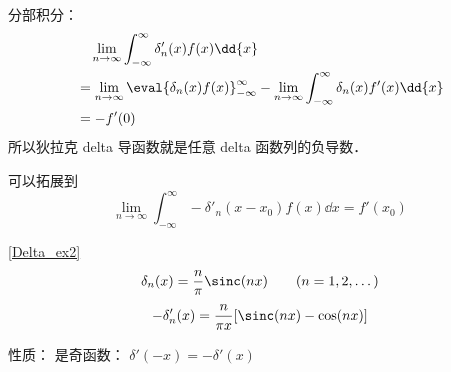 
\begin{issues}
\issueDraft
\end{issues}


分部积分：
\begin{equation}
\begin{aligned}
&\quad \lim_{n\to\infty}\int_{-\infty}^\infty \delta'_n(x) f(x) \dd{x}\\
&= \lim_{n\to\infty}\eval{\delta_n(x) f(x)}_{-\infty}^\infty - \lim_{n\to\infty}\int_{-\infty}^\infty \delta_n(x) f'(x) \dd{x}\\
&= - f'(0)
\end{aligned}
\end{equation}
所以狄拉克 delta 导函数就是任意 delta 函数列的负导数．

可以拓展到
\begin{equation}
\lim_{n\to\infty}\int_{-\infty}^\infty -\delta'_n(x-x_0) f(x) \dd{x} = f'(x_0)
\end{equation}

\begin{example}{}
\autoref{Delta_ex2}~
\begin{equation}
\delta_n(x) = \frac{n}{\pi}\sinc(n x) \qquad (n = 1, 2, \dots)
\end{equation}
\begin{equation}
-\delta'_n(x) = \frac{n}{\pi x} [\sinc(nx) - \cos(nx)]
\end{equation}
\end{example}

性质： 是奇函数： $\delta'(-x) = -\delta'(x)$